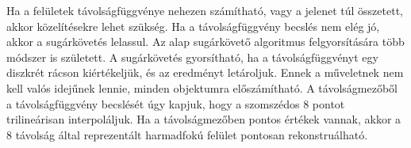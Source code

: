 Ha a felületek távolságfüggvénye nehezen számítható, vagy a jelenet túl összetett, akkor közelítésekre lehet szükség. Ha a távolságfüggvény becslés nem elég jó, akkor a sugárkövetés lelassul. Az alap sugárkövető algoritmus felgyorsítására több módszer is született. \cite{Keinert2014EnhancedST,BálintValasekAccST,QuadricTrace,RobBan} A sugárkövetés gyorsítható, ha a távolságfüggvényt egy diszkrét rácson kiértékeljük, és az eredményt letároljuk. Ennek a műveletnek nem kell valós idejűnek lennie, minden objektumra előszámítható. A távolságmezőből a távolságfüggvény becslését úgy kapjuk, hogy a szomszédos 8 pontot trilineárisan interpoláljuk. Ha a távolságmezőben pontos értékek vannak, akkor a 8 távolság által reprezentált harmadfokú felület pontosan rekonstruálható. \cite{Hansson-Soderlund2022SDF}



